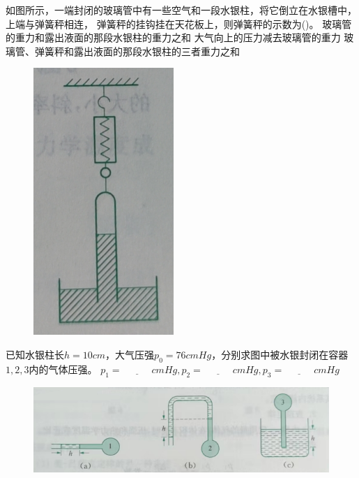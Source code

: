 \documentclass[a4paper,cs4size]{BHCexam}
\begin{document}
\begin{groups}
\begin{questions}[]
        \question[5] 如图所示，一端封闭的玻璃管中有一些空气和一段水银柱，将它倒立在水银槽中，上端与弹簧秤相连，
        弹簧秤的挂钩挂在天花板上，则弹簧秤的示数为(\quad\quad\quad)。
        {玻璃管的重力和露出液面的那段水银柱的重力之和}
        {大气向上的压力减去玻璃管的重力}
        {玻璃管、弹簧秤和露出液面的那段水银柱的三者重力之和}
        \begin{figure}[htb]
            \flushright
            \includegraphics [scale=0.4,trim=0 0 0 0]{./image/physics_pressure2_7.png}
            \label{fig:fig_pressure2_7}
        \end{figure}
        \vspace{0.5cm}

        \question[5] 已知水银柱长$h=10cm$，大气压强$p_0=76cmHg$，分别求图中被水银封闭在容器$1,2,3$内的气体压强。
        $p_1=\underline{\quad\quad\quad}cmHg, p_2=\underline{\quad\quad\quad}cmHg, p_3=\underline{\quad\quad\quad}cmHg$
        \begin{figure}[htb]
            \includegraphics [scale=0.8,trim=0 0 0 0]{./image/physics_pressure2_8.png}
            \label{fig:fig_pressure2_8}
        \end{figure}
    \end{questions}





\end{groups}


\label{lastpage}
\end{document}
